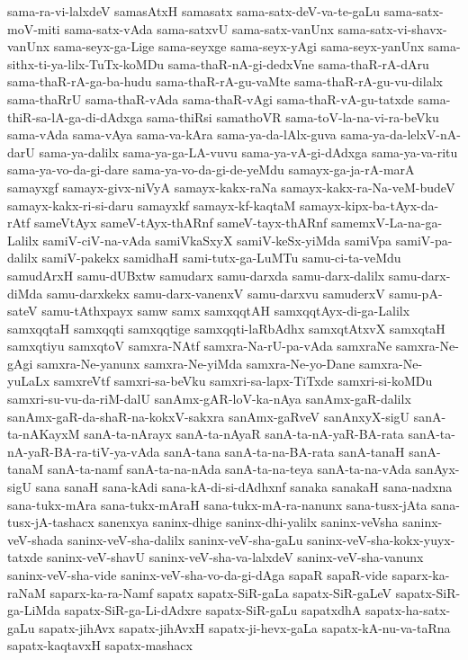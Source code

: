 {sama-ra-vi-lalxdeV
samasAtxH
samasatx
sama-satx-deV-va-te-gaLu
sama-satx-moV-miti
sama-satx-vAda
sama-satxvU
sama-satx-vanUnx
sama-satx-vi-shavx-vanUnx
sama-seyx-ga-Lige
sama-seyxge
sama-seyx-yAgi
sama-seyx-yanUnx
sama-sithx-ti-ya-lilx-TuTx-koMDu
sama-thaR-nA-gi-dedxVne
sama-thaR-rA-dAru
sama-thaR-rA-ga-ba-hudu
sama-thaR-rA-gu-vaMte
sama-thaR-rA-gu-vu-dilalx
sama-thaRrU
sama-thaR-vAda
sama-thaR-vAgi
sama-thaR-vA-gu-tatxde
sama-thiR-sa-lA-ga-di-dAdxga
sama-thiRsi
samathoVR
sama-toV-la-na-vi-ra-beVku
sama-vAda
sama-vAya
sama-va-kAra
sama-ya-da-lAlx-guva
sama-ya-da-lelxV-nA-darU
sama-ya-dalilx
sama-ya-ga-LA-vuvu
sama-ya-vA-gi-dAdxga
sama-ya-va-ritu
sama-ya-vo-da-gi-dare
sama-ya-vo-da-gi-de-yeMdu
samayx-ga-ja-rA-marA
samayxgf
samayx-givx-niVyA
samayx-kakx-raNa
samayx-kakx-ra-Na-veM-budeV
samayx-kakx-ri-si-daru
samayxkf
samayx-kf-kaqtaM
samayx-kipx-ba-tAyx-da-rAtf
sameVtAyx
sameV-tAyx-thARnf
sameV-tayx-thARnf
samemxV-La-na-ga-Lalilx
samiV-ciV-na-vAda
samiVkaSxyX
samiV-keSx-yiMda
samiVpa
samiV-pa-dalilx
samiV-pakekx
samidhaH
sami-tutx-ga-LuMTu
samu-ci-ta-veMdu
samudArxH
samu-dUBxtw
samudarx
samu-darxda
samu-darx-dalilx
samu-darx-diMda
samu-darxkekx
samu-darx-vanenxV
samu-darxvu
samuderxV
samu-pA-sateV
samu-tAthxpayx
samw
samx
samxqqtAH
samxqqtAyx-di-ga-Lalilx
samxqqtaH
samxqqti
samxqqtige
samxqqti-laRbAdhx
samxqtAtxvX
samxqtaH
samxqtiyu
samxqtoV
samxra-NAtf
samxra-Na-rU-pa-vAda
samxraNe
samxra-Ne-gAgi
samxra-Ne-yanunx
samxra-Ne-yiMda
samxra-Ne-yo-Dane
samxra-Ne-yuLaLx
samxreVtf
samxri-sa-beVku
samxri-sa-lapx-TiTxde
samxri-si-koMDu
samxri-su-vu-da-riM-dalU
sanAmx-gAR-loV-ka-nAya
sanAmx-gaR-dalilx
sanAmx-gaR-da-shaR-na-kokxV-sakxra
sanAmx-gaRveV
sanAnxyX-sigU
sanA-ta-nAKayxM
sanA-ta-nArayx
sanA-ta-nAyaR
sanA-ta-nA-yaR-BA-rata
sanA-ta-nA-yaR-BA-ra-tiV-ya-vAda
sanA-tana
sanA-ta-na-BA-rata
sanA-tanaH
sanA-tanaM
sanA-ta-namf
sanA-ta-na-nAda
sanA-ta-na-teya
sanA-ta-na-vAda
sanAyx-sigU
sana
sanaH
sana-kAdi
sana-kA-di-si-dAdhxnf
sanaka
sanakaH
sana-nadxna
sana-tukx-mAra
sana-tukx-mAraH
sana-tukx-mA-ra-nanunx
sana-tusx-jAta
sana-tusx-jA-tashacx
sanenxya
saninx-dhige
saninx-dhi-yalilx
saninx-veVsha
saninx-veV-shada
saninx-veV-sha-dalilx
saninx-veV-sha-gaLu
saninx-veV-sha-kokx-yuyx-tatxde
saninx-veV-shavU
saninx-veV-sha-va-lalxdeV
saninx-veV-sha-vanunx
saninx-veV-sha-vide
saninx-veV-sha-vo-da-gi-dAga
sapaR
sapaR-vide
saparx-ka-raNaM
saparx-ka-ra-Namf
sapatx
sapatx-SiR-gaLa
sapatx-SiR-gaLeV
sapatx-SiR-ga-LiMda
sapatx-SiR-ga-Li-dAdxre
sapatx-SiR-gaLu
sapatxdhA
sapatx-ha-satx-gaLu
sapatx-jihAvx
sapatx-jihAvxH
sapatx-ji-hevx-gaLa
sapatx-kA-nu-va-taRna
sapatx-kaqtavxH
sapatx-mashacx
}
